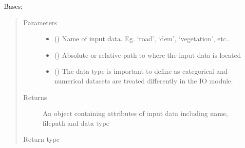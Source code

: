 \documentclass[letterpaper,10pt,english]{sphinxmanual}
\begin{document}
\begin{fulllineitems}
\label{\detokenize{lhat:lhat.IO.inputData}}
Bases: 
\begin{quote}\begin{description}
\item[{Parameters}] \leavevmode\begin{itemize}
\item {} 
 () \textendash{} Name of input data. Eg. ‘road’, ‘dem’, ‘vegetation’, etc..

\item {} 
 () \textendash{} Absolute or relative path to where the input data is located

\item {} 
 (\sphinxstyleliteralemphasis{\sphinxupquote{ (}}\sphinxstyleliteralemphasis{\sphinxupquote{)}}) \textendash{} The data type is important to define as categorical and numerical datasets
are treated differently in the IO module.

\end{itemize}

\item[{Returns}] \leavevmode
An object containing attributes of input data including name, filepath
and data type

\item[{Return type}] \leavevmode
{\hyperref[\detokenize{lhat:lhat.IO.inputData}]{}}

\end{description}\end{quote}

\end{fulllineitems}

\end{document}
